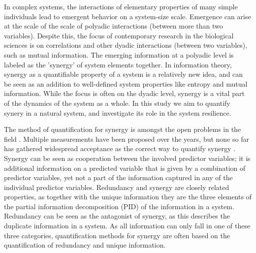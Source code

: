 \documentclass[../main.tex]{subfiles}
\begin{document}
In complex systems, the interactions of elementary properties of many simple individuals lead to emergent behavior on a system-size scale.
Emergence can arise at the scale of the scale of polyadic interactions (between more than two variables).
Despite this, the focus of contemporary research in the biological sciences is on correlations and other dyadic interactions (between two variables), such as mutual information.
The emerging information at a polyadic level is labeled as the 'synergy' of system elements together.
In information theory, synergy as a quantifiable property of a system is a relatively new idea, and can be seen as an addition to well-defined system properties like entropy and mutual information.
While the focus is often on the dyadic level, synergy is a vital part of the dynamics of the system as a whole.
In this study we aim to quantify synery in a natural system, and investigate its role in the system resilience.

The method of quantification for synergy is amongst the open problems in the field \cite{griffith2011quantifying, olbrich2015information}.
Multiple measurements have been proposed over the years, but none so far has gathered widespread acceptance as the correct way to quantify synergy \cite{griffith2014quantifying, olbrich2015information}.
Synergy can be seen as cooperation between the involved predictor variables; it is additional information on a predicted variable that is given by a combination of predictor variables, yet not a part of the information captured in any of the individual predictor variables.
Redundancy and synergy are closely related properties, as together with the unique information they are the three elements of the partial information decomposition (PID) of the information in a system.
Redundancy can be seen as the antagonist of synergy, as this describes the duplicate information in a system.
As all information can only fall in one of these three categories, quantification methods for synergy are often based on the quantification of redundancy and unique information.
\end{document}
